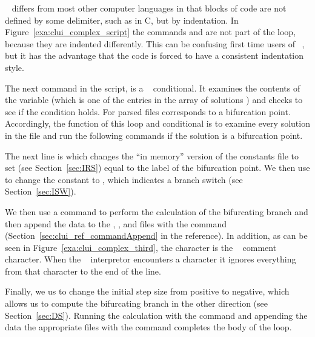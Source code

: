 \documentclass[12pt]{report}
\begin{document}
 \python~ differs from most other computer languages in that
 blocks of code are not defined by some delimiter, such
 as \commandf{\{\}} in {\cal C}, but by indentation.  
 In Figure~\ref{exa:clui_complex_script} the commands
  and  are not
 part of the loop, because they are indented 
 differently.  This can be confusing first time users of \python~,
 but it has the advantage that the code
 is forced to have a consistent indentation style.

 The next command in the script, 
 is a \python~ conditional.  
 It examines the contents of the
 variable  (which is one of the entries
 in the array of solutions ) 
 and checks to see if the condition
  holds.  
 For parsed 
 files   corresponds to a bifurcation
 point.  Accordingly, the function of this loop and conditional
 is to examine every solution in the  file and
 run the following commands if the solution is a bifurcation
 point.

 The next line
 is  which changes
 the ``in memory'' version of the \AUTO constants file to 
 set  (see Section~\ref{sec:IRS}) equal to the label
 of the bifurcation point. We then use  to change
 the \AUTO constant  to , which
 indicates a branch switch (see Section~\ref{sec:ISW}).

 We then use a  command to perform the
 calculation of the bifurcating branch and then append the
 data to the , , and
  files with the 
 command (Section~\ref{sec:clui_ref_commandAppend} in the reference).
 In addition, as can be seen in Figure~\ref{exa:clui_complex_third},
 the \commandf{\#} character is the \python~ comment character.
 When the \python~ interpretor encounters a \commandf{\#} character
 it ignores everything from that character to the end of the line.

 Finally, we us  to change the
 \AUTO initial step size from positive to negative, which allows
 us to compute the bifurcating branch in the other direction
 (see Section~\ref{sec:DS}).  Running the \AUTO calculation
 with the  command and appending the
 data the appropriate files with the  command
 completes the body of the loop.
\end{document}
